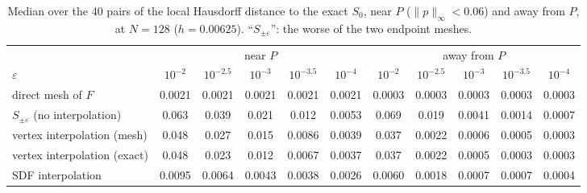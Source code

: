 \documentclass[12pt, a4paper]{article}
\theoremstyle{plain}
\theoremstyle{definition}
\theoremstyle{remark}
\theoremstyle{definition}
\begin{document}
\begin{table}[!h]
\centering
\small
\begin{adjustbox}{max width=\textwidth}
\begin{tabular}{l c c c c c c c c c c}
\toprule
& \multicolumn{5}{c}{near $P$} & \multicolumn{5}{c}{away from $P$} \\
\cmidrule(lr){2-6}\cmidrule(lr){7-11}
$\varepsilon$ & $10^{-2}$ & $10^{-2.5}$ & $10^{-3}$ & $10^{-3.5}$ & $10^{-4}$ & $10^{-2}$ & $10^{-2.5}$ & $10^{-3}$ & $10^{-3.5}$ & $10^{-4}$ \\
\midrule
direct mesh of $F$       & 0.0021 & 0.0021 & 0.0021 & 0.0021 & 0.0021 & 0.0003 & 0.0003 & 0.0003 & 0.0003 & 0.0003 \\
$S_{\pm\varepsilon}$ (no interpolation) & 0.063 & 0.039 & 0.021 & 0.012 & 0.0053 & 0.069 & 0.019 & 0.0041 & 0.0014 & 0.0007 \\
vertex interpolation (mesh)  & 0.048 & 0.027 & 0.015 & 0.0086 & 0.0039 & 0.037 & 0.0022 & 0.0006 & 0.0005 & 0.0003 \\
vertex interpolation (exact) & 0.048 & 0.023 & 0.012 & 0.0067 & 0.0037 & 0.037 & 0.0022 & 0.0005 & 0.0003 & 0.0003 \\
SDF interpolation            & 0.0095 & 0.0064 & 0.0043 & 0.0038 & 0.0026 & 0.0060 & 0.0018 & 0.0007 & 0.0007 & 0.0004 \\
\bottomrule
\end{tabular}
\end{adjustbox}
\caption[Interpolation: median errors]{Median over the $40$ pairs of the local Hausdorff distance to the exact $S_0$, near $P$ ($\|p\|_\infty<0.06$) and away from $P$, at $N=128$ ($h=0.00625$). ``$S_{\pm\varepsilon}$'': the worse of the two endpoint meshes.}
\label{tab:interp-median}
\end{table}
\end{document}
